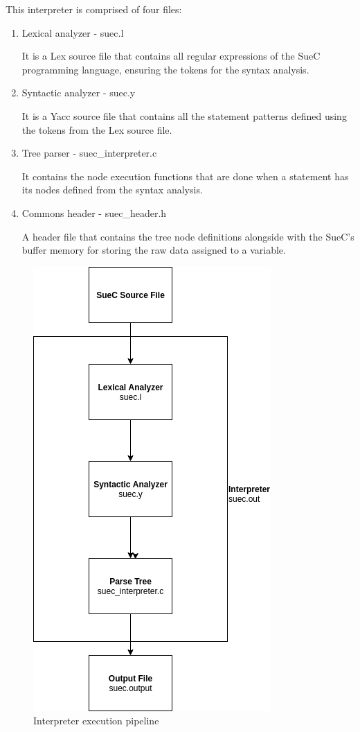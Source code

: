\documentclass[12pt,a4paper,twoside]{report}
\begin{document}
This interpreter is comprised of four files:
\begin{enumerate}
	\item Lexical analyzer - suec.l
		
		It is a Lex source file that contains all regular expressions of the SueC programming language, ensuring the tokens for the syntax analysis.
		
	\item Syntactic analyzer - suec.y
	
		It is a Yacc source file that contains all the statement patterns defined using the tokens from the Lex source file.
		
	\item Tree parser - suec\_interpreter.c 
	
		It contains the node execution functions that are done when a statement has its nodes defined from the syntax analysis.
		
	\item Commons header - suec\_header.h
		
		A header file that contains the tree node definitions alongside with the SueC's buffer memory for storing the raw data assigned to a variable.
\end{enumerate}


\begin{figure}[H]
    \centering
    \includegraphics[width=0.5\linewidth]{img/diags/InterpreterPipeline.png}
    \caption{Interpreter execution pipeline}
    \label{fig:conf}
\end{figure}
\end{document}
